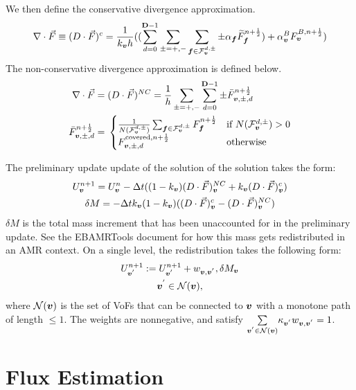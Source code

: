 We then define the conservative divergence approximation.
\begin{gather}
\nabla \cdot \vec{F} \equiv (D \cdot \vec{F})^c = \frac{1}{k_{\boldsymbol{v}}
h}((\sum^{{\mathbf{D}}-1}_{d=0} \sum_{\pm = +,-} \sum_{{\boldsymbol{f}} \in
\mathcal{F}^{d, \pm}_{\boldsymbol{v}}} \pm \alpha_{\boldsymbol{f}} \widetilde{F}^{n + \frac{1}{2}}_{\boldsymbol{f}}) +
\alpha^B_{\boldsymbol{v}} F^{B, {n + \frac{1}{2}}}_{\boldsymbol{v}}) 
\end{gather}
The non-conservative divergence approximation is defined below.
\begin{align}
\nabla \cdot \vec{F} =&\; (D \cdot \vec{F})^{NC} = \frac{1}{h}
\sum_{\pm = +, -} \sum^{{\mathbf{D}}-1}_{d=0} \pm \bar{F}^{n + \frac{1}{2}}_{{\boldsymbol{v}}, \pm,d} 
 \\ 
\bar{F}^{n + \frac{1}{2}}_{{\boldsymbol{v}}, \pm, d} =&\;
  \begin{cases}
\frac{1}{N(\mathcal{F}^{d, \pm}_{\boldsymbol{v}})} \sum_{{\boldsymbol{f}} \in
\mathcal{F}^{d, \pm}_{\boldsymbol{v}}} F^{n + \frac{1}{2}}_{\boldsymbol{f}} & \text{if
$N(\mathcal{F}^{d, \pm}_{\boldsymbol{v}}) > 0 $} \\ 
F^{\text{covered}, {n + \frac{1}{2}}}_{{\boldsymbol{v}}, \pm, d} & \text{otherwise}
  \end{cases}
\label{eqn::divnc}
\end{align}

The preliminary update update of the solution of the solution 
takes the form:
\begin{gather}
U^{n+1}_{\boldsymbol{v}} = U^n_{\boldsymbol{v}} - \Delta t((1-k_{\boldsymbol{v}})(D \cdot
\vec{F})^{NC}_{\boldsymbol{v}} + k_{\boldsymbol{v}}(D \cdot \vec{F})^c_{\boldsymbol{v}}) \\ 
\delta M = -\Delta t k_{\boldsymbol{v}} (1-k_{\boldsymbol{v}})((D \cdot \vec{F})^c_{\boldsymbol{v}}
- (D \cdot \vec{F})^{NC}_{\boldsymbol{v}}) 
\label{eqn::prelimup}
\end{gather}
$\delta M$ is the total mass increment that has been unaccounted for
in the preliminary update.  See the EBAMRTools document for how this
mass gets redistributed in an AMR context.  On a single level, the
redistribution takes the following form:
\begin{gather}
U^{n+1}_{\boldsymbol{v}^{'}} := U^{n+1}_{\boldsymbol{v}^{'}} + w_{{\boldsymbol{v}}, {\boldsymbol{v}^{'}}}, \delta
M_{\boldsymbol{v}} \\ {\boldsymbol{v}^{'}} \in \mathcal{N}({\boldsymbol{v}}), 
\label{eqn::redist}
\end{gather}
where $\mathcal{N}({\boldsymbol{v}})$ is the set of VoFs that can be connected
to ${\boldsymbol{v}}$ with a monotone path of length $\leq 1$. The weights are
nonnegative, and satisfy $\underset{{\boldsymbol{v}^{'}} \in
\mathcal{N}({\boldsymbol{v}})}{\sum} \kappa_{\boldsymbol{v}^{'}} w_{{\boldsymbol{v}}, {\boldsymbol{v}^{'}}} = 1$. 

\section{Flux Estimation}

